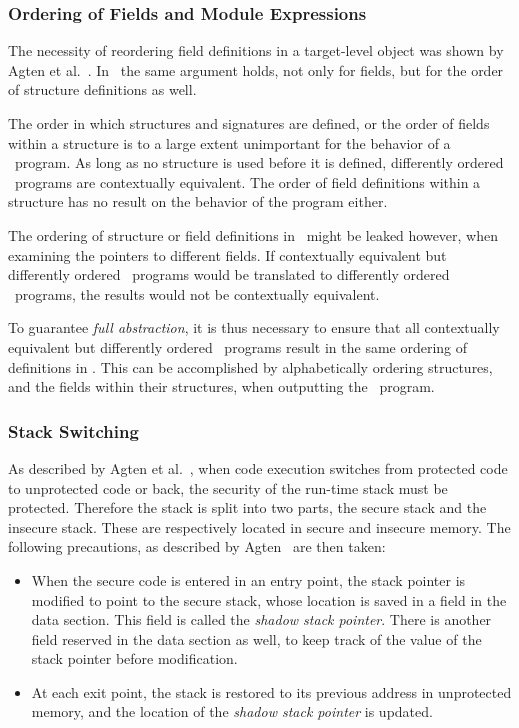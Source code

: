\subsubsection{Ordering of Fields and Module Expressions}
The necessity of reordering field definitions in a target-level object was shown by Agten et al.~\cite{Agten:2012:SCM:2354412.2355247}.
In \MiniML\ the same argument holds, not only for fields, but for the order of structure definitions as well.

The order in which structures and signatures are defined, or the order of fields within a structure is to a large extent unimportant for the behavior of a \MiniML\ program.
As long as no structure is used before it is defined, differently ordered \MiniML\ programs are contextually equivalent.
The order of field definitions within a structure has no result on the behavior of the program either.

The ordering of structure or field definitions in \LLVMIR\ might be leaked however, when examining the pointers to different fields.
If contextually equivalent but differently ordered \MiniML\ programs would be translated to differently ordered \LLVMIR\ programs, the results would not be contextually equivalent.

To guarantee \emph{full abstraction}, it is thus necessary to ensure that all contextually equivalent but differently ordered \MiniML\ programs result in the same ordering of definitions in \LLVMIR.
This can be accomplished by alphabetically ordering structures, and the fields within their structures, when outputting the \LLVMIR\ program.

\subsubsection{Stack Switching}
As described by Agten et al.~\cite{Agten:2012:SCM:2354412.2355247}, when code execution switches from protected code to unprotected code or back, the security of the run-time stack must be protected.
Therefore the stack is split into two parts, the secure stack and the insecure stack.
These are respectively located in secure and insecure memory.
The following precautions, as described by Agten~\cite{Agten:2012:SCM:2354412.2355247} are then taken:
\begin{itemize}
\item When the secure code is entered in an entry point, the stack pointer is modified to point to the secure stack, whose location is saved in a field in the data section.
This field is called the \emph{shadow stack pointer}.
There is another field reserved in the data section as well, to keep track of the value of the stack pointer before modification.
\item At each exit point, the stack is restored to its previous
address in unprotected memory, and the location of the \emph{shadow stack pointer} is updated.
\end{itemize}

